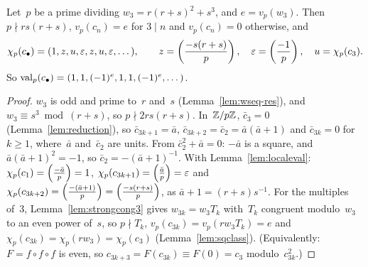 \begin{lemma}
  \label{lem:period3}
  \leanok
  Let~$p$ be a prime dividing $w_3 = r(r + s)^2 + s^3$, and $e = v_p(w_3)$. Then $p \nmid rs(r+s)$,
  $v_p(c_n) = e$ for $3 \mid n$ and $v_p(c_n) = 0$ otherwise, and
  \[ \chi_p(c_\bullet) = (1, z, u, \varepsilon, z, u, \varepsilon, \dots), \qquad
     z = \left(\frac{-s(r + s)}{p}\right), \quad \varepsilon = \left(\frac{-1}{p}\right), \quad u = \chi_p(c_3). \]
  So $\operatorname{val}_p(c_\bullet) = (1, 1, (-1)^e, 1, 1, (-1)^e, \dots)$.
\end{lemma}
\begin{proof}
  \leanok
  $w_3$ is odd and prime to~$r$ and~$s$ (Lemma~\ref{lem:wseq-res}), and $w_3 \equiv s^3
  \bmod (r + s)$, so $p \nmid 2rs(r+s)$. In~$\mathbb{Z}/p\mathbb{Z}$, $\bar c_3 = 0$ (Lemma~\ref{lem:reduction}),
  so $\bar c_{3k+1} = \bar a$, $\bar c_{3k+2} = \bar c_2 = \bar a(\bar a + 1)$ and $\bar c_{3k} = 0$
  for $k \ge 1$, where~$\bar a$ and~$\bar c_2$ are units. From $\bar c_2^2 + \bar a = 0$: $-\bar a$
  is a square, and $\bar a(\bar a + 1)^2 = -1$, so $\bar c_2 = -(\bar a + 1)^{-1}$. With
  Lemma~\ref{lem:localeval}: $\chi_p(c_1) = \left(\frac{-\bar a}{p}\right) = 1$, $\chi_p(c_{3k+1}) =
  \left(\frac{\bar a}{p}\right) = \varepsilon$ and $\chi_p(c_{3k+2}) = \left(\frac{-(\bar a + 1)}{p}\right) = \left(\frac{-s(r+s)}{p}\right)$, as
  $\bar a + 1 = (r + s) s^{-1}$. For the multiples of~$3$, Lemma~\ref{lem:strongcong3} gives
  $w_{3k} = w_3 T_k$ with~$T_k$ congruent modulo~$w_3$ to an even power of~$s$, so $p \nmid T_k$,
  $v_p(c_{3k}) = v_p(r w_3 T_k) = e$ and $\chi_p(c_{3k}) = \chi_p(r w_3) = \chi_p(c_3)$
  (Lemma~\ref{lem:sqclass}). (Equivalently: $F = f \circ f \circ f$ is even, so
  $c_{3k+3} = F(c_{3k}) \equiv F(0) = c_3$ modulo~$c_{3k}^2$.)
\end{proof}

